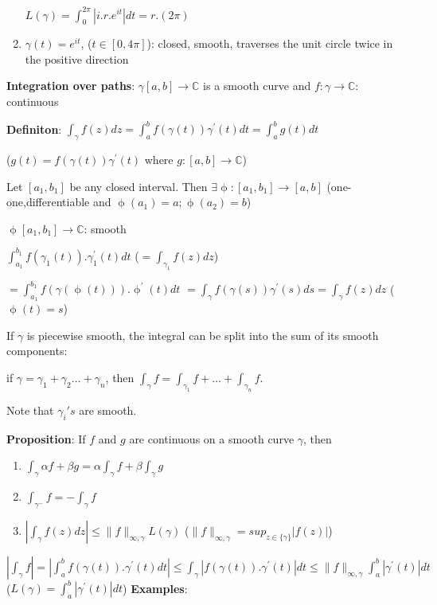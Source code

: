 \documentclass{article}
\begin{document}
\begin{flushleft}
\begin{enumerate}
    $L(\gamma)=\int_{0}^{2\pi} |i.r.e^{it}| dt= r.(2\pi)$
    
    \item $\gamma(t)=e^{it}$, ($t \in [0,4\pi]$): closed, smooth, traverses the unit circle twice in the positive direction
\end{enumerate}
\textbf{Integration over paths}:
$\gamma[a,b]\rightarrow \mathds{C}$ is a smooth curve and $f:\gamma \rightarrow \mathds{C}$: continuous 

\textbf{Definiton}: $\int_{\gamma}^{} f(z) dz= \int_{a}^{b} f(\gamma(t)) \gamma^{'}(t) dt=\int_{a}^{b}g(t) dt$ 

($g(t)=f(\gamma(t)) \gamma^{'}(t)$ where $g:[a,b]\rightarrow \mathds{C}$)

Let $[a_1,b_1]$ be any closed interval. Then $\exists \upphi:[a_1,b_1]\rightarrow [a,b]$ (one-one,differentiable and $\upphi(a_1)=a;\upphi(a_2)=b$)

$\upphi[a_1,b_1] \rightarrow \mathds{C}$: smooth 

$\int_{a_1}^{b_1}f(\gamma_1(t)).\gamma_1^{'}(t)dt$ ($=\int_{\gamma_1}^{}f(z) dz$)

$=\int_{a_1}^{b_1}f(\gamma(\upphi(t))).\upphi^{'}(t) dt$
$=\int_{\gamma}^{} f(\gamma(s)) \gamma^{'}(s) ds=\int_{\gamma}^{}f(z) dz$ ($\upphi(t)=s$)

If $\gamma$ is piecewise smooth, the integral can be split into the sum of its smooth components:

if $\gamma=\gamma_1+\gamma_2 \dots +\gamma_n$, then $\int_{\gamma}^{} f = \int_{\gamma_1}^{} f + \dots + \int_{\gamma_n}^{} f$.

Note that $\gamma_i's$ are smooth.

\textbf{Proposition}: If $f$ and $g$ are continuous on a smooth curve $\gamma$, then 
\begin{enumerate}
    \item $\int_{\gamma}^{} \alpha f+\beta g = \alpha \int_{\gamma}^{} f + \beta\int_{\gamma}^{} g$
    \item $\int_{\gamma^{-}}^{} f = - \int_{\gamma}^{} f$
    \item $|\int_{\gamma}^{} f(z) dz| \leq \|f\|_{\infty,\gamma} L(\gamma)$ ($\|f\|_{\infty,\gamma}=sup_{z\in \{\gamma\}}|f(z)|$)
\end{enumerate}

$|\int_{\gamma}^{} f|= |\int_{a}^{b} f(\gamma(t)).\gamma^{'}(t) dt| \leq \int_{\gamma}^{} |f(\gamma(t)).\gamma^{'}(t)| dt
\leq \|f\|_{\infty,\gamma} \int_{a}^{b} |\gamma^{'}(t)| dt$   ($L(\gamma)=\int_{a}^{b} |\gamma^{'}(t)| dt$)
\textbf{Examples}: 


\end{flushleft}
\end{document}
